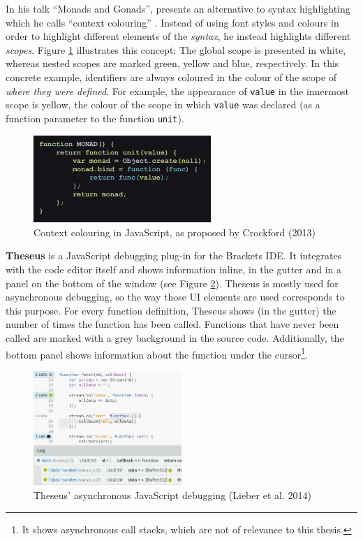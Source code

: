 In his talk “Monads and Gonads”,  presents an
alternative to syntax highlighting which he calls “context colouring”
\citeyear{crockford}. Instead of using font styles and colours in order
to highlight different elements of the \emph{syntax}, he instead
highlights different \emph{scopes}. Figure \ref{fig:contexthighlighting}
illustrates this concept: The global scope is presented in white,
whereas nested scopes are marked green, yellow and blue, respectively.
In this concrete example, identifiers are always coloured in the colour
of the scope of \emph{where they were defined}. For example, the
appearance of \texttt{value} in the innermost scope is yellow, the
colour of the scope in which \texttt{value} was declared (as a function
parameter to the function \texttt{unit}).

\begin{figure}[H]
\centering
\includegraphics[keepaspectratio,width=0.6\textwidth]{img/context.png}
\caption{Context colouring in JavaScript, as proposed by Crockford (2013)}
\label{fig:contexthighlighting}
\end{figure}

\textbf{Theseus} is a JavaScript debugging plug-in for the Brackets IDE.
It integrates with the code editor itself and shows information inline,
in the gutter and in a panel on the bottom of the window (see Figure
\ref{fig:theseus}). Theseus is mostly used for asynchronous debugging,
so the way those UI elements are used corresponds to this purpose. For
every function definition, Theseus shows (in the gutter) the number of
times the function has been called. Functions that have never been
called are marked with a grey background in the source code.
Additionally, the bottom panel shows information about the function
under the
cursor\footnote{It shows asynchronous call stacks, which are not of relevance to this thesis.}.

\begin{figure}[H]
\centering
\includegraphics[keepaspectratio,width=0.5\textwidth]{img/theseus.jpg}
\caption{Theseus’ asynchronous JavaScript debugging (Lieber et al. 2014)}
\label{fig:theseus}
\end{figure}

